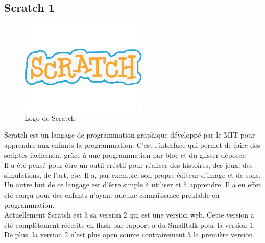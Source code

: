 \subsection{Scratch 1}
\begin{figure}[!h]
  \begin{center}
    \includegraphics[scale=0.4]{content/5-related_work/images/scratch}
    \caption{Logo de Scratch}
    \label{fig:scratch}
  \end{center}
\end{figure}
Scratch est un langage de programmation graphique développé par le MIT pour apprendre aux enfants la programmation. C'est l'interface qui permet de faire des scriptes facilement grâce à une programmation par bloc et du glisser-déposer.\\

Il a été pensé pour être un outil créatif pour réaliser des histoires, des jeux, des simulations, de l'art, etc. Il a, par exemple, son propre éditeur d'image et de sons. Un autre but de ce langage est d'être simple à utiliser et à apprendre. Il a en effet été conçu pour des enfants n'ayant aucune connaissance préalable en programmation.\\

Actuellement Scratch est à sa version 2 qui est une version web. Cette version a été complètement réécrite en flash par rapport a du Smalltalk pour la version 1. De plus, la version 2 n'est plus open source contrairement à la première version.

